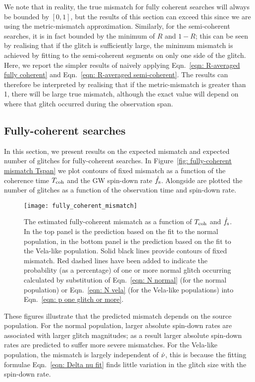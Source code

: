 \documentclass[../full_thesis/full_thesis.tex]{subfiles}
\begin{document}
We note that in reality, the true mismatch for fully coherent searches will
always be bounded by $[0, 1]$, but the results of this section can exceed this
since we are using the metric-mismatch approximation. Similarly, for the
semi-coherent searches, it is in fact bounded by the minimum of $R$ and $1-R$;
this can be seen by realising that if the glitch is sufficiently large, the
minimum mismatch is achieved by fitting to the semi-coherent segments on
only one side of the glitch. Here, we
report the simpler results of naively applying Eqn.~\eqref{eqn: R-averaged
fully coherent} and Eqn.~\eqref{eqn: R-averaged semi-coherent}. The results
can therefore be interpreted by realising that if the metric-mismatch is greater than
1, there will be large true mismatch, although the exact value will depend on
where that glitch occurred during the observation span.


\subsection{Fully-coherent searches}

In this section, we present results on the expected mismatch and expected number
of glitches for fully-coherent searches. In Figure~\ref{fig: fully-coherent mismatch
Tspan} we plot contours of fixed mismatch as a function of the coherence time
$T_{\mathrm{coh}}$ and the GW spin-down rate $\dot{f}_{\textrm{s}}$. Alongside are plotted the number of
glitches as a function of the observation time and spin-down rate.
\begin{figure}[htb]
\centering
\texttt{[image: fully\_coherent\_mismatch]}
\caption{The estimated fully-coherent mismatch as a function of $T_{\mathrm{coh}}$ and
$\dot{f}_{\textrm{s}}$. In the top panel is the prediction based on the fit to the normal
population, in the bottom panel is the prediction based on the fit to the
Vela-like population. Solid black lines provide contours of fixed mismatch. Red
dashed lines have been added to indicate the probability (as a percentage) of
one or more normal
glitch occurring calculated by substitution of Eqn.~\eqref{eqn: N normal} (for
the normal population) or Eqn.~\eqref{eqn: N vela} (for the Vela-like
populations) into Eqn.~\eqref{eqn: p one glitch or more}.}
\label{fig: fully-coherent mismatch Tspan}
\end{figure}

These figures illustrate that the predicted mismatch depends on the source
population. For the normal population, larger absolute spin-down rates are
associated with larger glitch magnitudes; as a result larger absolute spin-down
rates are predicted to suffer more severe mismatches. For the Vela-like
population, the mismatch is largely independent of $\dot{\nu}$, this is because
the fitting formulae Eqn.~\eqref{eqn: Delta nu fit} finds little variation in
the glitch size with the spin-down rate.
\end{document}

